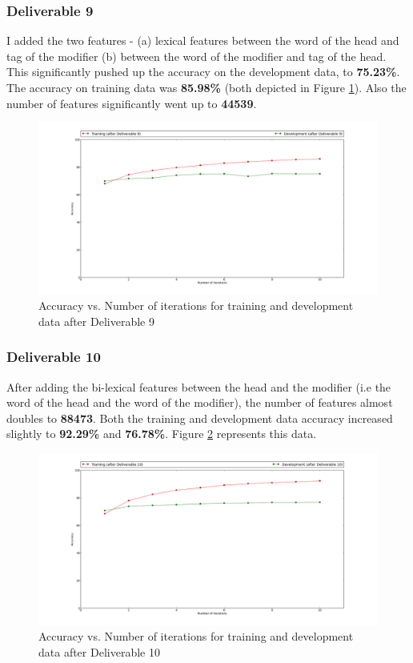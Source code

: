 \documentclass[10pt, letter]{article}
\begin{document}
\subsubsection*{Deliverable 9}
I added the two features - (a) lexical features between the word of the head and tag of the modifier (b) between the word of the modifier and tag of the head. This significantly pushed up the accuracy on the development data, to \textbf{75.23\%}. The accuracy on training data was \textbf{85.98\%} (both depicted in Figure \ref{deli9}). Also the number of features significantly went up to \textbf{44539}.

\begin{figure}[h!]
  \centering
    \includegraphics[scale = 0.25]{Images/deliverable9}
    \caption{Accuracy vs. Number of iterations for training and development data after Deliverable 9}
  \label{deli9}
\end{figure}

\subsubsection*{Deliverable 10}
After adding the bi-lexical features between the head and the modifier (i.e the word of the head and the word of the modifier), the number of features almost doubles to \textbf{88473}. Both the training and development data accuracy increased slightly to \textbf{92.29\%} and \textbf{76.78\%}. Figure \ref{deli10} represents this data.

\begin{figure}[h!]
  \centering
    \includegraphics[scale = 0.25]{Images/deliverable10}
    \caption{Accuracy vs. Number of iterations for training and development data after Deliverable 10}
  \label{deli10}
\end{figure}
\end{document}
